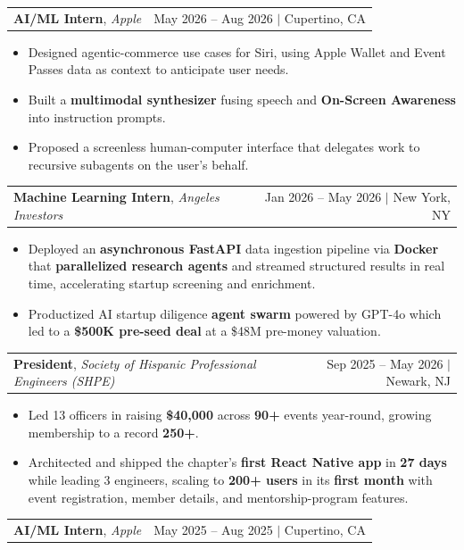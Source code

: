 \documentclass[letterpaper,10pt]{article}
\makeatletter
\newcommand{\resumeItem}[1]{\item\small{{#1}}}
\newcommand{\resumeOneLineHeading}[4]{
  \vspace{1pt}\item
    \begin{tabular*}{0.97\textwidth}[t]{l@{\extracolsep{\fill}}r}
      \textbf{#1}, \textit{#2} & \small #3 $|$ #4 \\
    \end{tabular*}\vspace{-3pt}
}
\newcommand{\resumeItemListStart}{
  \begin{itemize}[leftmargin=0.25in]
}
\newcommand{\resumeItemListEnd}{
  \end{itemize}\vspace{-3pt}
}
\makeatother
\begin{document}
    \resumeOneLineHeading
      {AI/ML Intern}
      {Apple}
      {May 2026 -- Aug 2026}
      {Cupertino, CA}

      \vspace{5pt}

      \resumeItemListStart
      \resumeItem{Designed agentic-commerce use cases for Siri, using Apple Wallet and Event Passes data as context to anticipate user needs.}
      \resumeItem{Built a \textbf{multimodal synthesizer} fusing speech and \textbf{On-Screen Awareness} into instruction prompts.}
      \resumeItem{Proposed a screenless human-computer interface that delegates work to recursive subagents on the user's behalf.}
      \resumeItemListEnd


    \resumeOneLineHeading
      {Machine Learning Intern}
      {Angeles Investors}
      {Jan 2026 -- May 2026}
      {New York, NY}

      \vspace{5pt}


      \resumeItemListStart
        \resumeItem{Deployed an \textbf{asynchronous FastAPI} data ingestion pipeline via \textbf{Docker} that \textbf{parallelized research agents} and streamed structured results in real time, accelerating startup screening and enrichment.}
        \resumeItem{Productized AI startup diligence \textbf{agent swarm} powered by GPT-4o which led to a \textbf{\$500K pre-seed deal} at a \$48M pre-money valuation.}
      \resumeItemListEnd
  



    \resumeOneLineHeading
      {President}
      {Society of Hispanic Professional Engineers (SHPE)}
      {Sep 2025 -- May 2026 }
      {Newark, NJ}

      \vspace{5pt}

      \resumeItemListStart
        \resumeItem{Led 13 officers in raising \textbf{\$40,000} across \textbf{90+} events year-round, growing membership to a record \textbf{250+}.}
        \resumeItem{Architected and shipped the chapter's \textbf{first React Native app} in \textbf{27 days} while leading 3 engineers, scaling to \textbf{200+ users} in its \textbf{first month} with event registration, member details, and mentorship-program features.}
      \resumeItemListEnd

    \resumeOneLineHeading
      {AI/ML Intern}
      {Apple}
      {May 2025 -- Aug 2025}
      {Cupertino, CA}

      \vspace{5pt}
\end{document}
